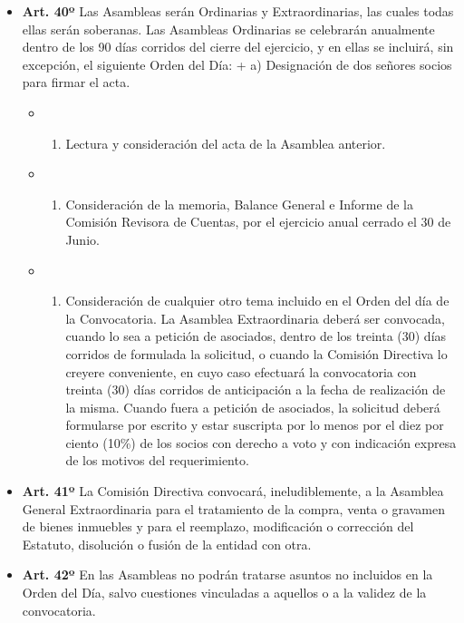\documentclass[]{book}
\providecommand{\tightlist}{%
  \setlength{\itemsep}{0pt}\setlength{\parskip}{0pt}}
\begin{document}
\begin{itemize}
\item
  \textbf{Art. 40º} Las Asambleas serán Ordinarias y Extraordinarias,
  las cuales todas ellas serán soberanas. Las Asambleas Ordinarias se
  celebrarán anualmente dentro de los 90 días corridos del cierre del
  ejercicio, y en ellas se incluirá, sin excepción, el siguiente Orden
  del Día: + a) Designación de dos señores socios para firmar el acta.

  \begin{itemize}
  \item
    \begin{enumerate}
    \def\labelenumi{\alph{enumi})}
    \setcounter{enumi}{1}
    \tightlist
    \item
      Lectura y consideración del acta de la Asamblea anterior.
    \end{enumerate}
  \item
    \begin{enumerate}
    \def\labelenumi{\alph{enumi})}
    \setcounter{enumi}{2}
    \tightlist
    \item
      Consideración de la memoria, Balance General e Informe de la
      Comisión Revisora de Cuentas, por el ejercicio anual cerrado el 30
      de Junio.
    \end{enumerate}
  \item
    \begin{enumerate}
    \def\labelenumi{\alph{enumi})}
    \setcounter{enumi}{3}
    \tightlist
    \item
      Consideración de cualquier otro tema incluido en el Orden del día
      de la Convocatoria. La Asamblea Extraordinaria deberá ser
      convocada, cuando lo sea a petición de asociados, dentro de los
      treinta (30) días corridos de formulada la solicitud, o cuando la
      Comisión Directiva lo creyere conveniente, en cuyo caso efectuará
      la convocatoria con treinta (30) días corridos de anticipación a
      la fecha de realización de la misma. Cuando fuera a petición de
      asociados, la solicitud deberá formularse por escrito y estar
      suscripta por lo menos por el diez por ciento (10\%) de los socios
      con derecho a voto y con indicación expresa de los motivos del
      requerimiento.
    \end{enumerate}
  \end{itemize}
\item
  \textbf{Art. 41º} La Comisión Directiva convocará, ineludiblemente, a
  la Asamblea General Extraordinaria para el tratamiento de la compra,
  venta o gravamen de bienes inmuebles y para el reemplazo, modificación
  o corrección del Estatuto, disolución o fusión de la entidad con otra.
\item
  \textbf{Art. 42º} En las Asambleas no podrán tratarse asuntos no
  incluidos en la Orden del Día, salvo cuestiones vinculadas a aquellos
  o a la validez de la convocatoria.
\end{itemize}
\end{document}
